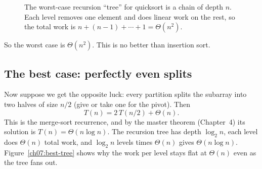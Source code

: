 \begin{figure}[h]
\centering
{}
\caption{The worst-case recursion ``tree'' for quicksort is a chain of
depth $n$. Each level removes one element and does linear work on the rest, so
the total work is $n + (n-1) + \cdots + 1 = \Theta(n^2)$.}
\label{ch07:worst-chain}
\end{figure}

So the worst case is $\Theta(n^2)$. This is no better than insertion
sort.

\subsection{The best case: perfectly even splits}

Now suppose we get the opposite luck: every partition splits the subarray into
two halves of size $n/2$ (give or take one for the pivot). Then
\[
T(n) = 2\,T(n/2) + \Theta(n).
\]
This is the merge-sort recurrence, and by the master theorem (Chapter~4) its
solution is $T(n) = \Theta(n \log n)$. The recursion tree has depth $\log_2 n$,
each level does $\Theta(n)$ total work, and $\log_2 n$ levels times $\Theta(n)$
gives $\Theta(n \log n)$. Figure~\ref{ch07:best-tree} shows why the work per
level stays flat at $\Theta(n)$ even as the tree fans out.

